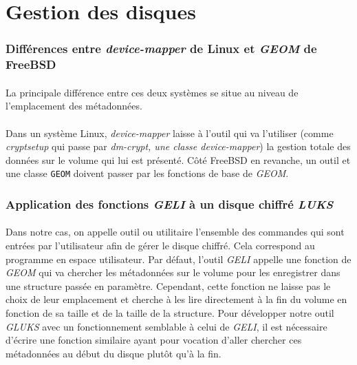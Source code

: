 \section{Gestion des disques}

\subsubsection{Différences entre \textit{device-mapper} de Linux et
  \textit{GEOM} de FreeBSD}
\paragraph{}
La principale différence entre ces deux systèmes se situe au niveau de
l'emplacement des métadonnées.
\paragraph{}
Dans un système Linux, \textit{device-mapper} laisse à l'outil qui va l'utiliser
(comme \textit{cryptsetup} qui passe par \textit{dm-crypt, une classe
  \textit{device-mapper}}) la gestion totale des données sur le volume qui lui
est présenté. Côté FreeBSD en revanche, un outil et une classe \texttt{GEOM}
doivent passer par les fonctions de base de \textit{GEOM}.

\subsubsection{Application des fonctions \textit{GELI} à un disque chiffré \textit{LUKS}}
\paragraph{}
Dans notre cas, on appelle outil ou utilitaire l'ensemble des commandes qui sont entrées par
l'utilisateur afin de gérer le disque chiffré. Cela correspond au programme en espace utilisateur.
Par défaut, l'outil \textit{GELI} appelle une fonction de \textit{GEOM} qui va chercher les métadonnées sur le
volume pour les enregistrer dans une structure passée en paramètre. Cependant,
cette fonction ne laisse pas le choix de leur emplacement et cherche à les lire
directement à la fin du volume en fonction de sa taille et de la taille de la
structure. Pour développer notre outil \textit{GLUKS} avec un fonctionnement
semblable à celui de \textit{GELI}, il est nécessaire d'écrire une fonction
similaire ayant pour vocation d'aller chercher ces métadonnées au début du
disque plutôt qu'à la fin.

